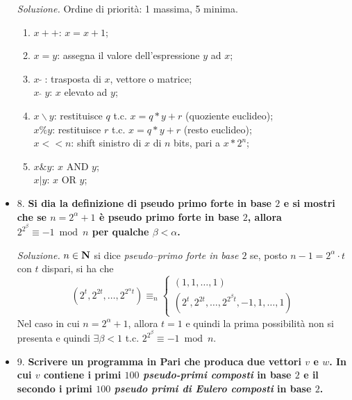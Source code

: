 \documentclass{article}
\begin{document}
\begin{itemize}
\noindent\emph{Soluzione.} Ordine di priorit\`a: 1 massima, 5
minima.
\begin{enumerate}
\item $x++$: $x=x+1$;
\item $x=y$: assegna il valore dell'espressione $y$ ad $x$;
\item $x\;\tilde{ }\;$: trasposta di $x$, vettore o matrice;\\
$x\;\hat{}\;y$: $x$ elevato ad $y$;
\item $x\backslash y$: restituisce $q$ t.c. $x=q * y+r$ (quoziente euclideo);\\
$x\%y$: restituisce $r$ t.c. $x=q* y+r$ (resto euclideo);\\
$x<<n$: shift sinistro di $x$ di $n$ bits, pari a $x*2^n$;
\item $x\&y$: $x$ AND $y$;\\
$x|y$: $x$ OR $y$;
\end{enumerate}
\bigskip

\item{8.} \textbf{Si dia la definizione di pseudo primo forte in
base $2$ e si mostri che se $n=2^\alpha+1$ \`{e} pseudo primo
forte in base $2$, allora $2^{2^\beta}\equiv -1\bmod n$ per
qualche $\beta<\alpha$.}\medskip


\noindent\emph{Soluzione.} $n\in{\bf N}$ si dice
\emph{pseudo--primo forte in base $2$} se, posto
$n-1=2^\alpha\cdot t$ con $t$ dispari, si ha che
$$(2^t,2^{2t},\ldots,2^{2^\alpha t})\equiv_n\left\{
\begin{array}{l}
(1,1,\ldots,1)\\
(2^t,2^{2t},\ldots,2^{2^\beta t},-1,1,\ldots,1)\end{array}
\right.$$ Nel caso in cui $n=2^\alpha+1$, allora $t=1$ e quindi la
prima possibilit\`{a} non si presenta e quindi $\exists\beta<1$
t.c. $2^{2^\beta}\equiv -1\bmod n.$
\bigskip

\item{9.} \textbf{Scrivere un programma in Pari che produca due
vettori $v$ e $w$. In cui $v$ contiene i primi $100$ {\it
pseudo-primi composti} in base $2$ e il secondo i primi $100$ {\it
pseudo primi di Eulero composti} in base $2$.}\medskip


\end{itemize}
\end{document}
